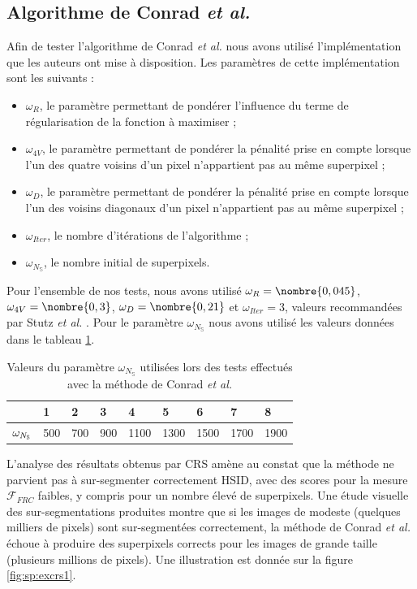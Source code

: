  \subsection{Algorithme de Conrad \textit{et al.}}
 
 Afin de tester l'algorithme de Conrad \textit{et al.} \cite{conrad2013contour}\modif{,} nous avons utilisé l'implémentation que les auteurs ont mise à disposition. Les paramètres de cette implémentation sont les suivants :
 \begin{itemize}
 \item $\omega_{R}$, le paramètre permettant de pondérer l'influence du terme de régularisation de la fonction à maximiser ;
 \item $\omega_{4V}$, le paramètre permettant de pondérer la pénalité prise en compte lorsque l'un des quatre voisins d'un pixel n'appartient pas au même superpixel ;
 \item $\omega_{D}$, le paramètre permettant de pondérer la pénalité prise en compte lorsque l'un des voisins diagonaux d'un pixel n'appartient pas au même superpixel ;
 \item $\omega_{Iter}$, le nombre d'itérations de l'algorithme ;
 \item $\omega_{N_{\mathbb{S}}}$, le nombre initial de superpixels.
 \end{itemize}
 Pour l'ensemble de nos tests, nous avons utilisé $\omega_{R}=\nombre{0,045}$, $\omega_{4V}=\nombre{0,3}$, $\omega_{D}=\nombre{0,21}$ et $\omega_{Iter}=3$, valeurs recommandées par Stutz \textit{et al.} \cite{stutz2015superpixel}. Pour le paramètre $\omega_{N_{\mathbb{S}}}$ nous avons utilisé les valeurs données dans le tableau \ref{tab:sp:CRSParam}.
  \begin{table}[htb]
\caption{Valeurs du paramètre $\omega_{N_{\mathbb{S}}}$ utilisées lors des tests effectués avec la méthode de Conrad \textit{et al.}}
\centering
\begin{tabular}{|l|l|l|l|l|l|l|l|l|}
\hline
\cellcolor{gris}{\modif{Test}  }& 1 & 2 & 3 &4 & 5&6 &7 &8 \\
\hline
$\cellcolor{gris}{\omega_{N_{\mathbb{S}}}}$&500&700&900&1100&1300&1500&1700&1900 \\
\hline
\end{tabular}
\label{tab:sp:CRSParam}
\end{table}

L'analyse des résultats obtenus par CRS  \cite{conrad2013contour}  amène au constat que la méthode ne parvient pas à sur-segmenter correctement HSID, avec des scores pour la mesure $\mathcal{F}_{FRC}$ faibles, y compris pour un nombre élevé de superpixels. Une étude visuelle des sur-segmentations produites montre que si les images de  modeste (quelques milliers de pixels) sont sur-segmentées correctement, la méthode de Conrad \textit{et al.} échoue à produire des superpixels corrects pour les images de grande taille (plusieurs millions de pixels). Une illustration est donnée sur la figure \ref{fig:sp:excrs1}. 
  
